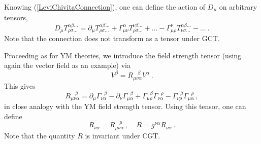 \documentclass[12pt]{article}
\begin{document}
Knowing (\ref{LeviChivitaConnection}), one can define the action of $D_\mu$ on arbitrary tensors,
\begin{equation}
D_\mu T^{\alpha\beta...}_{\rho\sigma...}=\partial_\mu T^{\alpha\beta...}_{\rho\sigma...}+\Gamma_{\mu\nu}^\alpha T^{\nu\beta...}_{\rho\sigma...}+...-\Gamma_{\mu\rho}^{\nu}T^{\alpha\beta...}_{\nu\sigma...}-... ~ .
\end{equation}
Note that the connection does not transform as a tensor under GCT.

Proceeding as for YM theories, we introduce the field strength tensor (using again the vector field as an example) via
\begin{equation}
[D_\mu, D_\nu]V^\beta=R_{\mu\nu\alpha}^{~~~~\beta} V^\alpha \,.
\end{equation}
This gives
\begin{equation}
R_{\mu\nu\alpha}^{~~~~\beta}=\partial_\mu\Gamma_{\nu\alpha}^{~~~\beta}-\partial_\nu\Gamma_{\mu\alpha}^{~~~\beta}
+\Gamma_{\mu\rho}^{~~~\beta}\Gamma^{~~~\rho}_{\nu\alpha}-\Gamma_{\nu\rho}^{~~~\beta}\Gamma_{\mu\alpha}^{~~~\rho} \,,
\end{equation}
in close analogy with the YM field strength tensor. Using this tensor, one can define
\begin{equation}
R_{\nu\alpha}=R_{\mu\nu\alpha}^{~~~~\mu} \,,~~~~~ R=g^{\nu\alpha}R_{\nu\alpha}\,.
\end{equation}
Note that the quantity $R$ is invariant under CGT.
\end{document}

